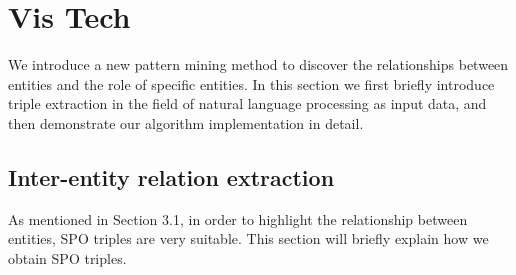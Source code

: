 	
\section{Vis Tech}
\noindent  We introduce a new pattern mining method to discover the relationships between entities and the role of specific entities. In this section we first briefly introduce triple extraction in the field of natural language processing as input data, and then demonstrate our algorithm implementation in detail.

\subsection{Inter-entity relation extraction}
\noindent As mentioned in Section 3.1, in order to highlight the relationship between entities, SPO triples are very suitable. This section will briefly explain how we obtain SPO triples.


